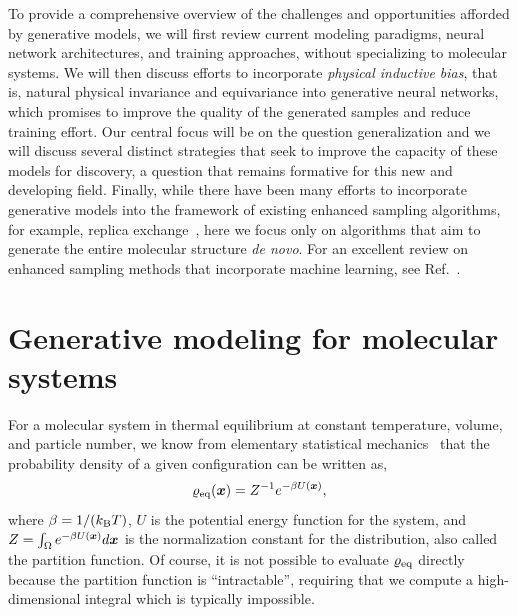 \documentclass[11pt]{article}
\begin{document}
To provide a comprehensive overview of the challenges and opportunities afforded by generative models, we will first review current modeling paradigms, neural network architectures, and training approaches, without specializing to molecular systems. 
We will then discuss efforts to incorporate \emph{physical inductive bias}, that is, natural physical invariance and equivariance into generative neural networks, which promises to improve the quality of the generated samples and reduce training effort.
Our central focus will be on the question generalization and we will discuss several distinct strategies that seek to improve the capacity of these models for discovery, a question that remains formative for this new and developing field.
Finally, while there have been many efforts to incorporate generative models into the framework of existing enhanced sampling algorithms, for example, replica exchange~\cite{invernizzi_skipping_2022, wang_2023}, here we focus only on algorithms that aim to generate the entire molecular structure \emph{de novo}.
For an excellent review on enhanced sampling methods that incorporate machine learning, see Ref.~\cite{mehdi_enhanced_2023}.


\section{Generative modeling for molecular systems}

For a molecular system in thermal equilibrium at constant temperature, volume, and particle number, we know from elementary statistical mechanics~\cite{chandler_introduction_1987} that the probability density of a given configuration can be written as,
\begin{equation}
    \varrho_{\rm eq}(\boldsymbol{x}) = Z^{-1} e^{-\beta U(\boldsymbol{x})},
    \label{eq:rhoeq}
\end{equation}
where $\beta=1/(k_{\rm B} T)$, $U$ is the potential energy function for the system, and $Z = \int_{\Omega} e^{-\beta U(\boldsymbol{x})} d\boldsymbol{x}$ is the normalization constant for the distribution, also called the partition function. 
Of course, it is not possible to evaluate $\varrho_{\rm eq}$ directly because the partition function is ``intractable'', requiring that we compute a high-dimensional integral which is typically impossible.
\end{document}
